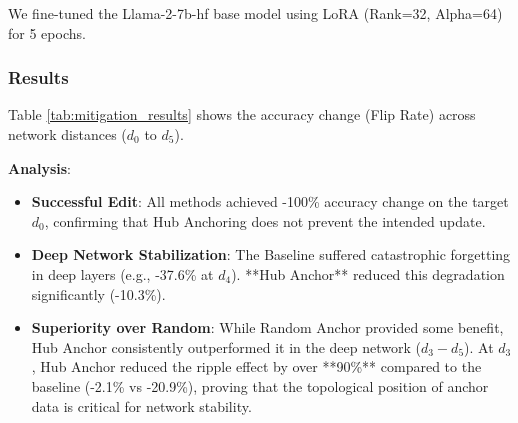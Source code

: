 We fine-tuned the Llama-2-7b-hf base model using LoRA (Rank=32, Alpha=64) for 5 epochs.

\subsubsection{Results}
Table \ref{tab:mitigation_results} shows the accuracy change (Flip Rate) across network distances ($d_0$ to $d_5$).

\begin{table}[h]
\centering
\small
{}
\caption{\label{tab:mitigation_results} \textbf{Mitigation Effectiveness}. Hub Anchor significantly outperforms baselines. Note that both Random and Hub Anchor strategies use the same number of regularization samples ($N=400$) to ensure a fair comparison.}
\end{table}

\textbf{Analysis}:
\begin{itemize}
    \item \textbf{Successful Edit}: All methods achieved -100\% accuracy change on the target $d_0$, confirming that Hub Anchoring does not prevent the intended update.
    \item \textbf{Deep Network Stabilization}: The Baseline suffered catastrophic forgetting in deep layers (e.g., -37.6\% at $d_4$). **Hub Anchor** reduced this degradation significantly (-10.3\%).
    \item \textbf{Superiority over Random}: While Random Anchor provided some benefit, Hub Anchor consistently outperformed it in the deep network ($d_3-d_5$). At $d_3$, Hub Anchor reduced the ripple effect by over **90\%** compared to the baseline (-2.1\% vs -20.9\%), proving that the topological position of anchor data is critical for network stability.
\end{itemize}

